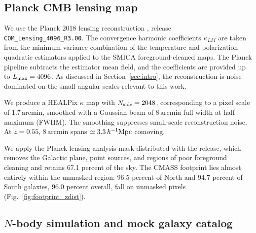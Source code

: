 \documentclass[preprint]{aastex701}
\newcommand{\hinvMpc}{h^{-1}{\rm Mpc}}
\begin{document}
\subsection{Planck CMB lensing map}
\label{sec:data_planck}

We use the Planck 2018 lensing reconstruction \citep{Planck2018lensing},
release \texttt{COM\_Lensing\_4096\_R3.00}. The convergence harmonic
coefficients $\kappa_{LM}$ are taken from the minimum-variance combination
of the temperature and polarization quadratic estimators applied to the
SMICA foreground-cleaned maps. The Planck pipeline subtracts the estimator
mean field, and the coefficients are provided up to
$L_{\rm max}=4096$. As discussed in Section~\ref{sec:intro}, the
reconstruction is noise dominated on the small angular scales relevant to
this work.

We produce a HEALPix \citep{Gorski2005} $\kappa$ map with $N_{\rm side}=2048$, corresponding to a pixel scale of $1.7\,\mathrm{arcmin}$, smoothed with a Gaussian beam of $8\,\mathrm{arcmin}$ full width at half maximum (FWHM).
The smoothing suppresses small-scale reconstruction
noise. At $z=0.55$, $8\,\mathrm{arcmin}$ spans
$\simeq3.3\,\hinvMpc$ comoving. 

We apply the Planck lensing analysis mask distributed with the release,
which removes the Galactic plane, point sources, and regions of poor
foreground cleaning and retains 67.1 percent of the sky. %
The CMASS footprint lies almost entirely within the unmasked region: 96.5 percent of North and 94.7 percent of South galaxies, 96.0 percent overall, fall on unmasked
pixels (Fig.~\ref{fig:footprint_zdist}). 

\subsection{$N$-body simulation and mock galaxy catalog}
\label{sec:sim}
\end{document}
